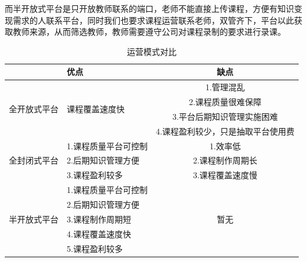 而半开放式平台是只开放教师联系的端口，老师不能直接上传课程，方便有知识变现需求的人联系平台，同时我们也要求课程运营联系老师，双管齐下，平台以此获取教师来源，从而筛选教师，教师需要遵守公司对课程录制的要求进行录课。
\vfill
\begin{table}[H]
  \centering
  \caption{运营模式对比}
    \begin{tabular}{|r|p{8.89em}|c|}
    \hline
    \textcolor[rgb]{ .298,  .282,  .239}{} & \textcolor[rgb]{ .298,  .282,  .239}{优点} & \multicolumn{1}{p{14.055em}|}{\textcolor[rgb]{ .298,  .282,  .239}{缺点}} \\
    \hline
    \multicolumn{1}{|r|}{\multirow{4}[2]{*}{\textcolor[rgb]{ .298,  .282,  .239}{全开放式平台}}} & \multirow{4}[2]{*}{\textcolor[rgb]{ .298,  .282,  .239}{课程覆盖速度快}} & \multicolumn{1}{p{14.055em}|}{\textcolor[rgb]{ .298,  .282,  .239}{1.管理混乱}} \\
          & \multicolumn{1}{c|}{} & \multicolumn{1}{p{14.055em}|}{\textcolor[rgb]{ .298,  .282,  .239}{2.课程质量很难保障}} \\
          & \multicolumn{1}{c|}{} & \multicolumn{1}{p{14.055em}|}{\textcolor[rgb]{ .298,  .282,  .239}{3.平台后期知识管理实施困难}} \\
          & \multicolumn{1}{c|}{} & \multicolumn{1}{p{14.055em}|}{\textcolor[rgb]{ .298,  .282,  .239}{4.课程盈利较少，只是抽取平台使用费}} \\
    \hline
    \multicolumn{1}{|r|}{\multirow{3}[2]{*}{\textcolor[rgb]{ .298,  .282,  .239}{全封闭式平台}}} & \textcolor[rgb]{ .298,  .282,  .239}{1.课程质量平台可控制} & \multicolumn{1}{p{14.055em}|}{\textcolor[rgb]{ .298,  .282,  .239}{1.效率低}} \\
          & \textcolor[rgb]{ .298,  .282,  .239}{2.后期知识管理方便} & \multicolumn{1}{p{14.055em}|}{\textcolor[rgb]{ .298,  .282,  .239}{2.课程制作周期长}} \\
          & \textcolor[rgb]{ .298,  .282,  .239}{3.课程盈利较多} & \multicolumn{1}{p{14.055em}|}{\textcolor[rgb]{ .298,  .282,  .239}{3.课程覆盖速度慢}} \\
    \hline
    \multicolumn{1}{|r|}{\multirow{5}[2]{*}{\textcolor[rgb]{ .298,  .282,  .239}{半开放式平台}}} & \textcolor[rgb]{ .298,  .282,  .239}{1.课程质量平台可控制} & \multicolumn{1}{c|}{\multirow{5}[2]{*}{\textcolor[rgb]{ .298,  .282,  .239}{暂无}}} \\
          & \textcolor[rgb]{ .298,  .282,  .239}{2.后期知识管理方便} &  \\
          & \textcolor[rgb]{ .298,  .282,  .239}{3.课程制作周期短} &  \\
          & \textcolor[rgb]{ .298,  .282,  .239}{4.课程覆盖速度快} &  \\
          & \textcolor[rgb]{ .298,  .282,  .239}{5.课程盈利较多} &  \\
    \hline
    \end{tabular}%
  \label{tab:yymsdb}%
\end{table}%


